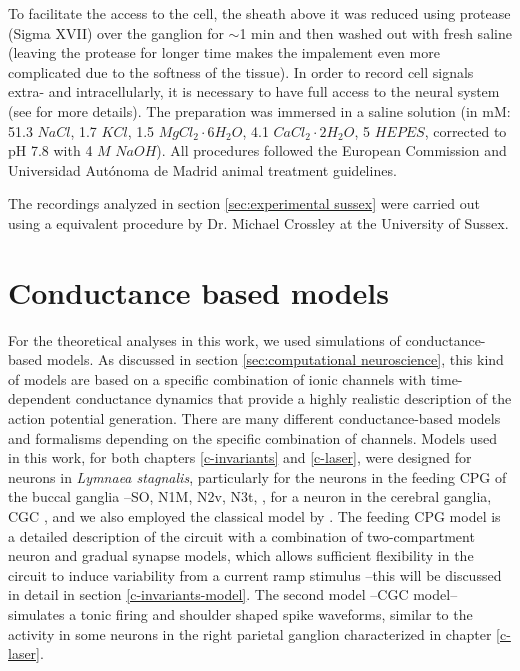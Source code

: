 To facilitate the access to the cell, the sheath above it was reduced using protease (Sigma XVII) over the ganglion for $\sim$1 min and then washed out with fresh saline (leaving the protease for longer time makes the impalement even more complicated due to the softness of the tissue). In order to record cell signals extra- and intracellularly, it is necessary to have full access to the neural system (see \cite{garrido-pena_tfm_2022} for more details). The preparation was immersed in a saline solution (in mM: 51.3 $NaCl$, 1.7 $KCl$, 1.5 $MgCl_2\cdot6H_2O$, 4.1 $CaCl_2\cdot2H_2O$, 5 $HEPES$, corrected to pH 7.8 with 4 $M$ $NaOH$). All procedures followed the European Commission and Universidad Autónoma de Madrid animal treatment guidelines.

The recordings analyzed in section \ref{sec:experimental sussex} were carried out using a equivalent procedure by Dr. Michael Crossley at the University of Sussex. 


\section{Conductance based models}
For the theoretical analyses in this work, we used simulations of conductance-based models. As discussed in section \ref{sec:computational neuroscience}, this kind of models are based on a specific combination of ionic channels with time-dependent conductance dynamics that provide a highly realistic description of the action potential generation. There are many different conductance-based models and formalisms depending on the specific combination of channels. Models used in this work, for both chapters \ref{c-invariants} and \ref{c-laser}, were designed for  neurons in \textit{Lymnaea stagnalis}, particularly for the neurons in the feeding CPG of the buccal ganglia --SO, N1M, N2v, N3t, \parencite{vavoulis_dynamic_2007}, for a neuron in the cerebral ganglia, CGC \parencite{vavoulis_balanced_2010}, and we also employed  the classical model by \textcite{hodgkin_quantitative_1952}. The feeding CPG model is a detailed description of the circuit with a combination of two-compartment neuron and  gradual synapse models, which allows sufficient flexibility in the circuit to induce variability from a current ramp stimulus --this will be discussed in detail in section \ref{c-invariants-model}. The second model --CGC model-- simulates a tonic firing and shoulder shaped spike waveforms, similar to the activity in some neurons in the right parietal ganglion characterized in chapter \ref{c-laser}.

